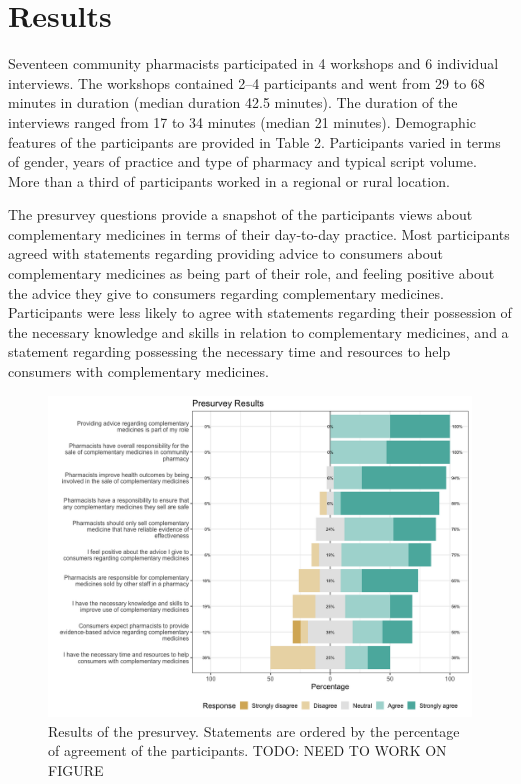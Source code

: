 \documentclass[11pt,a4paper]{article}
\begin{document}
\section{Results}\label{results}

Seventeen community pharmacists participated in 4 workshops and 6
individual interviews. The workshops contained 2--4 participants and
went from 29 to 68 minutes in duration (median duration 42.5 minutes).
The duration of the interviews ranged from 17 to 34 minutes (median 21
minutes). Demographic features of the participants are provided in Table
2. Participants varied in terms of gender, years of practice and type of
pharmacy and typical script volume. More than a third of participants
worked in a regional or rural location.



The presurvey questions provide a snapshot of the participants views
about complementary medicines in terms of their day-to-day practice.
Most participants agreed with statements regarding providing advice to
consumers about complementary medicines as being part of their role, and
feeling positive about the advice they give to consumers regarding
complementary medicines. Participants were less likely to agree with
statements regarding their possession of the necessary knowledge and
skills in relation to complementary medicines, and a statement regarding
possessing the necessary time and resources to help consumers with
complementary medicines.

\begin{figure}
\centering
\includegraphics{fig_tab/presurvey.png}
\caption{Results of the presurvey. Statements are ordered by the
percentage of agreement of the participants. TODO: NEED TO WORK ON
FIGURE}
\end{figure}
\end{document}
